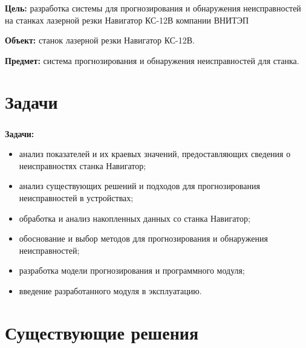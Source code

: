 \begin{frame}
\frametitle{\insertsection}

\textbf{Цель:} разработка системы для прогнозирования и обнаружения неисправностей
на станках лазерной резки Навигатор КС-12В компании ВНИТЭП

\vspace{\baselineskip}

\textbf{Объект:} станок лазерной резки Навигатор КС-12В.

\vspace{\baselineskip}

\textbf{Предмет:} система прогнозирования и обнаружения неисправностей для станка.

\end{frame}



\section{Задачи}

\begin{frame}
\frametitle{\insertsection}

\textbf{Задачи:}
\begin{itemize}
    \item анализ показателей и их краевых значений, предоставляющих сведения о неисправностях станка Навигатор;
    \item анализ существующих решений и подходов для прогнозирования неисправностей в устройствах;
    \item обработка и анализ накопленных данных со станка Навигатор;
    \item обоснование и выбор методов для прогнозирования и обнаружения неисправностей;
    \item разработка модели прогнозирования и программного модуля;
    \item введение разработанного модуля в эксплуатацию.
\end{itemize}

\end{frame}


\section{Существующие решения}

